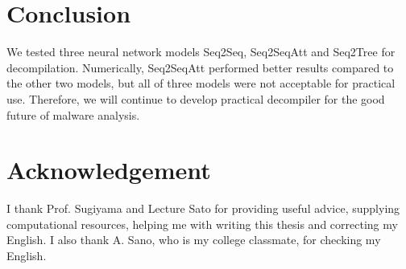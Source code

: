 \documentclass[senior,final,11pt]{iscs-thesis}
\begin{document}
\chapter{Conclusion}
We tested three neural network models Seq2Seq, Seq2SeqAtt and Seq2Tree for decompilation.
Numerically, Seq2SeqAtt performed better results compared to the other two models,
but all of three models were not acceptable for practical use.
Therefore, we will continue to develop practical decompiler for the good future of malware analysis.

\chapter{Acknowledgement}
I thank Prof. Sugiyama and Lecture Sato for providing useful advice, supplying computational resources, helping me with writing this thesis and 
correcting my English.
I also thank A. Sano, who is my college classmate, for checking my English.



\end{document}
